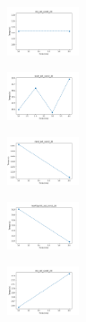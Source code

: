 \begin{figure}[H]    
    \centering
    \begin{subfigure}
        \centering
        \includegraphics[width=0.234\textwidth]{img/copkm/iris_set_const_20_949004259_time.png}
    \end{subfigure}
    \hfill
    \begin{subfigure}
        \centering
        \includegraphics[width=0.234\textwidth]{img/copkm/ecoli_set_const_20_949004259_time.png}
    \end{subfigure}
    \hfill
    \begin{subfigure}
        \centering
        \includegraphics[width=0.234\textwidth]{img/copkm/rand_set_const_20_949004259_time.png}
    \end{subfigure}
    \hfill
    \begin{subfigure}
        \centering
        \includegraphics[width=0.234\textwidth]{img/copkm/newthyroid_set_const_20_949004259_time.png}
    \end{subfigure}
    \hfill
    \begin{subfigure}
        \centering
        \includegraphics[width=0.234\textwidth]{img/copkm/iris_set_const_20_589741062_time.png}
    \end{subfigure}
    \hfill

\end{figure}
